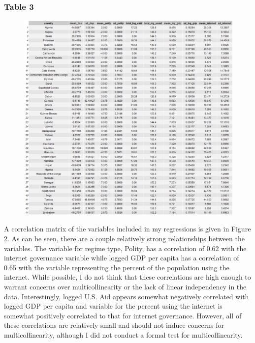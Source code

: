 \documentclass[12pt]{article}
\begin{document}
\subsubsection*{Table 3}
\begin{figure}[htbp]
    \includegraphics[scale=0.45]{Figures/summary.png}
\end{figure}

\pagebreak
A correlation matrix of the variables included in my regressions is given in Figure 2. As can be seen, there are a couple relatively strong relationships between the variables. The variable for regime type, Polity, has a correlation of 0.62 with the internet governance variable while logged GDP per capita has a correlation of 0.65 with the variable representing the percent of the population using the internet. While possible, I do not think that these correlations are high enough to warrant concerns over multicollinearity or the lack of linear independency in the data. Interestingly, logged U.S. Aid appears somewhat negatively correlated with logged GDP per capita and variable for the percent using the internet is somewhat positively correlated to that for internet governance. However, all of these correlations are relatively small and should not induce concerns for multicollinearity, although I did not conduct a formal test for multicollinearity.

\pagebreak
\end{document}
